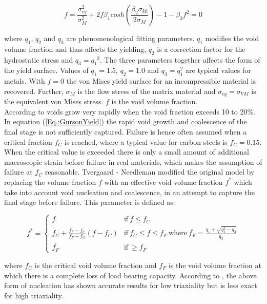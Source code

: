 \documentclass{article}
\begin{document}
\begin{equation}
  f=\frac{\sigma^2_{eq}}{\sigma^2_M}+2f\beta_1cosh(\frac{\beta_2\sigma_{kk}}{2\sigma_M})-1-\beta_3f^2=0  
 \label{Eq.:GursonYield}
\end{equation}

where $q_1$, $q_2$ and $q_3$ are phenomenological fitting parameters. $q_1$ modifies the void volume fraction and thus affects the yielding, $q_2$ is a correction factor for the hydrostatic stress and $q_3={q_1}^2$. The three parameters together affects the form of the yield surface. Values of $q_1 = 1.5$, $q_2 = 1.0$ and $q_3 = q_1^2$ are typical values for metals. With $f=0$ the von Mises yield surface for an incompressible material is recovered. Further, $\sigma_M$ is the flow stress of the  matrix material and $\sigma_{eq} =\sigma_{VM}$ is the equivalent von Mises stress. $f$ is the void volume fraction. \\

According to \cite{FractureMechanics} voids grow very rapidly when the void fraction exceeds 10 to 20\%. In equation (\ref{Eq.:GursonYield}) the rapid void growth and coalescence of the final stage is not sufficiently captured. Failure is hence often assumed when a critical fraction $f_C$ is reached, where a typical value for carbon steels is $f_C = 0.15$. When the critical value is exceeded there is only a small amount of additional macroscopic strain before failure in real materials, which makes the assumption of failure at $f_C$ reasonable. Tvergaard - Needleman modified the original model by replacing the volume fraction $f$ with an effective void volume fraction $f^*$ which take into account void nucleation and coalescence, in an attempt to capture the final stage before failure. This parameter is defined as:


    

\begin{equation}
    f^*=
    \begin{cases}
        f & \text{if}\    f \leq f_C\\
        f_C+\frac{\overline{f_F}-f_C}{f_F-f_C}(f-f_C) & \text{if}\ f_C\leq f \leq f_F\ \text{where}\ \overline{f_F}=\frac{q_1+\sqrt{q_1^2-q_3}}{q_3}\\
        \overline{f_F} &\text{if}\ \geq f_F 
    \end{cases}
    \label{Eq:FractureCriteria}
\end{equation} 

where $f_C$ is the critical void volume fraction and $f_F$ is the void volume fraction at which there is a complete loss of load bearing capacity. According to \cite{UsersManMetalPlast}, the above form of nucleation has shown accurate results for low triaxiality but is less exact for high triaxiality. 
\end{document}
